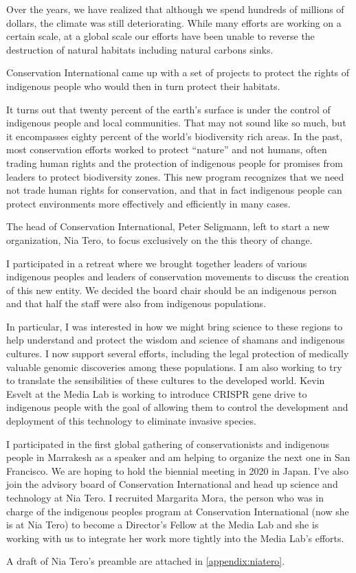Over the years, we have realized that although we spend hundreds of millions of dollars, the climate was still deteriorating. While many efforts are working on a certain scale, at a global scale our efforts have been unable to reverse the destruction of natural habitats including natural carbons sinks.

Conservation International came up with a set of projects to protect the rights of indigenous people who would then in turn protect their habitats.

It turns out that twenty percent of the earth's surface is under the control of indigenous people and local communities. That may not sound like so much, but it encompasses eighty percent of the world's biodiversity rich areas. In the past, most conservation efforts worked to protect ``nature'' and not humans, often trading human rights and the protection of indigenous people for promises from leaders to protect biodiversity zones. This new program recognizes that we need not trade human rights for conservation, and that in fact indigenous people can protect environments more effectively and efficiently in many cases.

The head of Conservation International, Peter Seligmann, left to start a new organization, Nia Tero, to focus exclusively on the this theory of change.

I participated in a retreat where we brought together leaders of various indigenous peoples and leaders of conservation movements to discuss the creation of this new entity. We decided the board chair should be an indigenous person and that half the staff were also from indigenous populations.

In particular, I was interested in how we might bring science to these regions to help understand and protect the wisdom and science of shamans and indigenous cultures. I now support several efforts, including the legal protection of medically valuable genomic discoveries among these populations. I am also working to try to translate the sensibilities of these cultures to the developed world. Kevin Esvelt at the Media Lab is working to introduce CRISPR gene drive to indigenous people with the goal of allowing them to control the development and deployment of this technology to eliminate invasive species.

I participated in the first global gathering of conservationists and indigenous people in Marrakesh as a speaker and am helping to organize the next one in San Francisco. We are hoping to hold the biennial meeting in 2020 in Japan. I've also join the advisory board of Conservation International and head up science and technology at Nia Tero. I recruited Margarita Mora, the person who was in charge of the indigenous peoples program at Conservation International (now she is at Nia Tero) to become a Director's Fellow at the Media Lab and she is working with us to integrate her work more tightly into the Media Lab's efforts.

A draft of Nia Tero's preamble are attached in \autoref{appendix:niatero}.